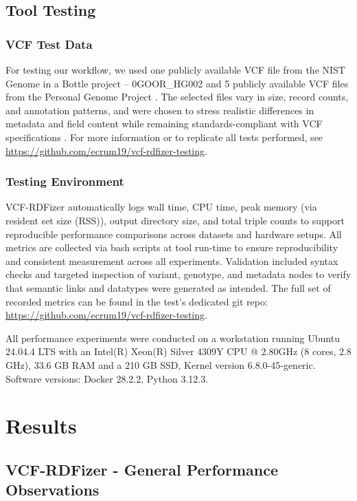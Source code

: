 \documentclass[unnumsec,webpdf,contemporary,large]{oup-authoring-template}
\begin{document}
\subsection{Tool Testing}\label{subsec2.3}

\subsubsection{VCF Test Data}\label{subsec2.3.1}
For testing our workflow, we used one publicly available VCF file from the NIST Genome in a Bottle project -- 0GOOR\_HG002 \cite{nist_gib_2025} and 5 publicly available VCF files from the Personal Genome Project \cite{personal_genome_proj}.
The selected files vary in size, record counts, and annotation patterns, and were chosen to stress realistic differences in metadata and field content while remaining standards-compliant with VCF specifications \cite{vcf_spec_2024}.
For more information or to replicate all tests performed, see \url{https://github.com/ecrum19/vcf-rdfizer-testing}.

\subsubsection{Testing Environment}\label{subsec2.3.2}
VCF-RDFizer automatically logs wall time, CPU time, peak memory (via resident set size (RSS)), output directory size, and total triple counts to support reproducible performance comparisons across datasets and hardware setups. 
All metrics are collected via bash scripts at tool run-time to ensure reproducibility and consistent measurement across all experiments. 
Validation included syntax checks and targeted inspection of variant, genotype, and metadata nodes to verify that semantic links and datatypes were generated as intended.
The full set of recorded metrics can be found in the test's dedicated git repo: \url{https://github.com/ecrum19/vcf-rdfizer-testing}.

All performance experiments were conducted on a workstation running Ubuntu 24.04.4 LTS with an Intel(R) Xeon(R) Silver 4309Y CPU @ 2.80GHz (8 cores, 2.8 GHz), 33.6 GB RAM and a 210 GB SSD, Kernel version 6.8.0-45-generic. Software versions: Docker 28.2.2, Python 3.12.3.


\section{Results}\label{sec3}

\subsection{VCF-RDFizer - General Performance Observations}\label{subsec3.1} 
\end{document}
